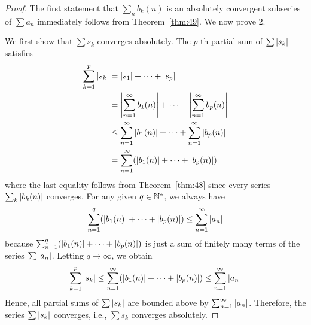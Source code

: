 \documentclass[thmcnt=section, 12pt]{my-elegantbook}
\begin{document}
\begin{proof}
    The first statement that $\sum_n b_k(n)$ is an absolutely convergent subseries of $\sum a_n$ immediately follows from Theorem~\ref{thm:49}. We now prove 2. 

    We first show that $\sum s_k$ converges absolutely. The $p$-th partial sum of $\sum \left\lvert s_k \right\rvert$ satisfies
    \begin{align*}
        \sum_{k=1}^p \left\lvert s_k \right\rvert
        &= \left\lvert s_1 \right\rvert + \cdots + \left\lvert s_p \right\rvert \\ 
        &= \left\lvert  \sum_{n=1}^\infty b_1(n)  \right\rvert + \cdots
        + \left\lvert  \sum_{n=1}^\infty b_p(n)  \right\rvert \\ 
        &\leq \sum_{n=1}^\infty \left\lvert b_1(n) \right\rvert + \cdots
        + \sum_{n=1}^\infty \left\lvert b_p(n) \right\rvert \\
        &= \sum_{n=1}^\infty ( \left\lvert b_1(n) \right\rvert + \cdots
        + \left\lvert b_p(n) \right\rvert )
    \end{align*}
    where the last equality follows from Theorem~\ref{thm:48} since every series $\sum_{k} \left\lvert b_k(n) \right\rvert$ converges. For any given $q \in \mathbb{N}^\ast$, we always have
    \begin{align*}
        \sum_{n=1}^q ( \left\lvert b_1(n) \right\rvert + \cdots
        + \left\lvert b_p(n) \right\rvert )
        \leq \sum_{n=1}^\infty \left\lvert a_n \right\rvert
    \end{align*}
    because $\sum_{n=1}^q ( \left\lvert b_1(n) \right\rvert + \cdots + \left\lvert b_p(n) \right\rvert )$ is just a sum of finitely many terms of the series $\sum \left\lvert a_n \right\rvert$. Letting $q \to \infty$, we obtain
    \begin{align*}
        \sum_{k=1}^p \left\lvert s_k \right\rvert
        \leq \sum_{n=1}^\infty ( \left\lvert b_1(n) \right\rvert + \cdots
        + \left\lvert b_p(n) \right\rvert )
        \leq \sum_{n=1}^\infty \left\lvert a_n \right\rvert
    \end{align*}
    Hence, all partial sums of $\sum \left\lvert s_k \right\rvert$ are bounded above by $\sum_{n=1}^\infty \left\lvert a_n \right\rvert$. Therefore, the series $\sum \left\lvert s_k \right\rvert$ converges, i.e., $\sum s_k$ converges absolutely.


\end{proof}
\end{document}
